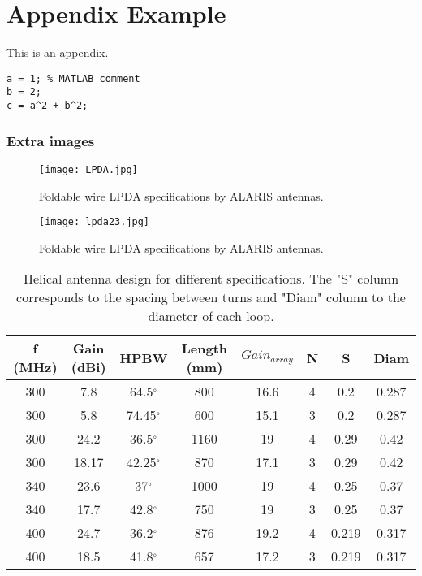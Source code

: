 \chapter{Appendix Example}\label{app:appendix_example}

This is an appendix.

\begin{lstlisting}
a = 1; % MATLAB comment
b = 2;
c = a^2 + b^2;
\end{lstlisting}

% 
	
	
\subsection{Extra images}
\begin{figure}[h]
    \centering
    \texttt{[image: LPDA.jpg]}
    \caption{Foldable wire LPDA specifications by ALARIS antennas.}
    \label{LPDA1}
\end{figure}

\begin{figure}[h]
    \centering
    \texttt{[image: lpda23.jpg]}
    \caption{Foldable wire LPDA specifications by ALARIS antennas.}
    \label{LPDA2}
\end{figure}

\begin{table}[H]
\centering
\begin{tabular}{| c | c | c | c | c | c | c | c |}
\hline
 f (MHz) & Gain (dBi) & HPBW & Length (mm) & $Gain_{array}$ & N & S & Diam \\ 
 \hline
 300 & 7.8 & 64.5$^\circ$ & 800 & 16.6 & 4 & 0.2 & 0.287 \\  
 \hline
 300 & 5.8 & 74.45$^\circ$ & 600 & 15.1 & 3 & 0.2 & 0.287 \\  
 \hline
 300 & 24.2 & 36.5$^\circ$ & 1160 & 19 & 4 & 0.29 & 0.42 \\
 \hline
 300 & 18.17 & 42.25$^\circ$ & 870 & 17.1 & 3 & 0.29 & 0.42  \\
 \hline
 340 & 23.6 & 37$^\circ$ & 1000 & 19 & 4 & 0.25 & 0.37  \\
 \hline
 340 & 17.7 & 42.8$^\circ$ & 750 & 19 & 3 & 0.25 & 0.37  \\
 \hline
 400 & 24.7 & 36.2$^\circ$ & 876 & 19.2 & 4 & 0.219 & 0.317  \\
 \hline
 400 & 18.5 & 41.8$^\circ$ & 657 & 17.2 & 3 & 0.219 & 0.317  \\
 \hline
\end{tabular}
\caption{Helical antenna design for different specifications. The "S" column corresponds to the spacing between turns and "Diam" column to the diameter of each loop.}
\label{table: Helicals}
\end{table}

